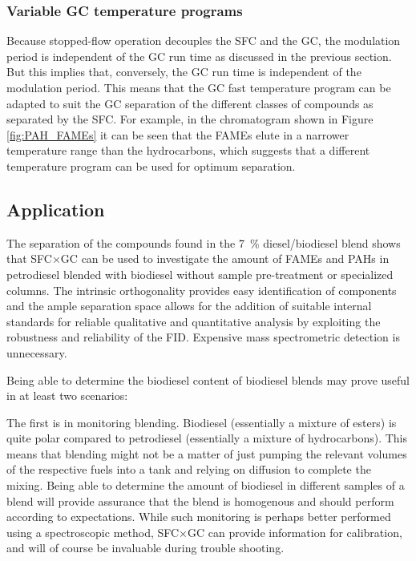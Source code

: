 \subsubsection{Variable GC temperature programs}

Because stopped-flow operation decouples the SFC and the GC, the modulation
period is independent of the GC run time as discussed in the previous section.
But this implies that, conversely,  the GC run time is independent of the
modulation period. This means that the GC fast temperature program can be
adapted to suit the GC separation of the different classes of compounds as
separated by the SFC. For example, in the chromatogram shown in Figure
\ref{fig:PAH_FAMEs} it can be seen that the FAMEs elute in a narrower
temperature range than the hydrocarbons, which suggests that a different
temperature program can be used for optimum separation.

\subsection{Application}

The separation of the compounds found in the \SI{7}{\percent} diesel/biodiesel
blend shows that SFC×GC can be used to investigate the amount of FAMEs and PAHs
in petrodiesel blended with biodiesel without sample pre-treatment or
specialized columns. The intrinsic orthogonality provides easy identification of
components and the ample separation space allows for the addition of suitable
internal standards for reliable qualitative and quantitative analysis by
exploiting the robustness and reliability of the FID. Expensive mass
spectrometric detection is unnecessary.

Being able to determine the biodiesel content of biodiesel blends may prove
useful in at least two scenarios:

The first is in monitoring blending. Biodiesel (essentially a mixture of esters)
is quite polar compared to petrodiesel (essentially a mixture of hydrocarbons).
This means that blending might not be a matter of just pumping the relevant
volumes of the respective fuels into a tank and relying on diffusion to complete
the mixing. Being able to determine the amount of biodiesel in different samples
of a blend will provide assurance that the blend is homogenous and should
perform according to expectations. While such monitoring is perhaps better
performed using a spectroscopic method, SFC×GC can provide information for
calibration, and will of course be invaluable during trouble shooting.

